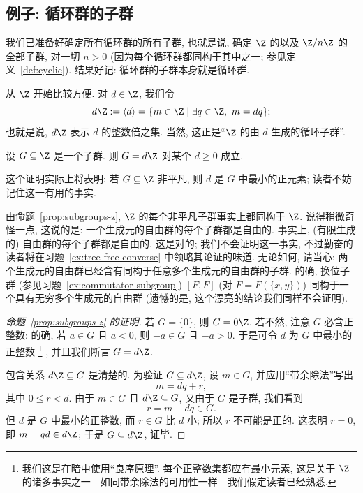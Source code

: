 \subsection{例子: 循环群的子群}
\label{subsec:subgroups-cyclic}

我们已准备好确定所有循环群的所有子群, 也就是说, 确定 $\Z$ 的以及 $\Z/n\Z$ 的全部子群, 对一切 $n > 0$ (因为每个循环群都同构于其中之一; 参见定义~\ref{def:cyclic}). 结果好记: 循环群的子群本身就是循环群.

从 $\Z$ 开始比较方便. 对 $d \in \Z$, 我们令
\[
d\Z := \langle d \rangle = \{m \in \Z \mid \exists q \in \Z,\ m = dq\};
\]
也就是说, $d\Z$ 表示 $d$ 的整数倍之集. 当然, 这正是``$\Z$ 的由 $d$ 生成的循环子群''.

\begin{proposition}
\label{prop:subgroups-z}
设 $G \subseteq \Z$ 是一个子群. 则 $G = d\Z$ 对某个 $d \geq 0$ 成立.
\end{proposition}

这个证明实际上将表明: 若 $G \subseteq \Z$ 非平凡, 则 $d$ 是 $G$ 中最小的正元素; 读者不妨记住这一有用的事实.

\begin{remark}
\label{rem:nielsen-schreier}
由命题~\ref{prop:subgroups-z}, $\Z$ 的每个非平凡子群事实上都同构于 $\Z$. 说得稍微奇怪一点, 这说的是: 一个生成元的自由群的每个子群都是自由的. 事实上, (有限生成的) 自由群的每个子群都是自由的, 这是对的; 我们不会证明这一事实, 不过勤奋的读者将在习题~\ref{ex:tree-free-converse} 中领略其论证的味道. 无论如何, 请当心: 两个生成元的自由群已经含有同构于任意多个生成元的自由群的子群. 的确, 换位子群%
(参见习题~\ref{ex:commutator-subgroup}) $[F, F]$ (对 $F = F(\{x, y\})$) 同构于一个具有无穷多个生成元的自由群 (遗憾的是, 这个漂亮的结论我们同样不会证明).
\end{remark}

\begin{proof}[命题~\ref{prop:subgroups-z} 的证明]
若 $G = \{0\}$, 则 $G = 0\Z$. 若不然, 注意 $G$ 必含正整数: 的确, 若 $a \in G$ 且 $a < 0$, 则 $-a \in G$ 且 $-a > 0$. 于是可令 $d$ 为 $G$ 中最小的正整数%
\footnote{我们这是在暗中使用``良序原理''. 每个正整数集都应有最小元素, 这是关于 $\Z$ 的诸多事实之一---如同带余除法的可用性一样---我们假定读者已经熟悉.}%
, 并且我们断言 $G = d\Z$.

包含关系 $d\Z \subseteq G$ 是清楚的. 为验证 $G \subseteq d\Z$, 设 $m \in G$, 并应用``带余除法''写出
\[
m = dq + r,
\]
其中 $0 \leq r < d$. 由于 $m \in G$ 且 $d\Z \subseteq G$, 又由于 $G$ 是子群, 我们看到
\[
r = m - dq \in G.
\]
但 $d$ 是 $G$ 中最小的正整数, 而 $r \in G$ 比 $d$ 小; 所以 $r$ 不可能是正的. 这表明 $r = 0$, 即 $m = qd \in d\Z$; 于是 $G \subseteq d\Z$, 证毕.
\end{proof}

